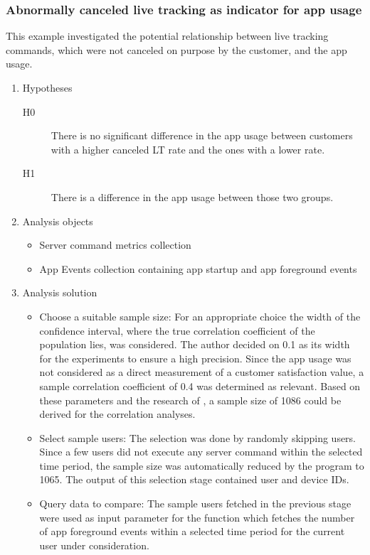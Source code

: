 \subsubsection{Abnormally canceled live tracking as indicator for app usage}
\label{sssec:liveTrackingAppUsage}
This example investigated the potential relationship between live tracking commands, which were not canceled on purpose by the customer, and the app usage.  

\begin{enumerate}
	\item Hypotheses
	\begin{description}
		\item[H0] There is no significant difference in the app usage between customers with a higher canceled LT rate and the ones with a lower rate.
		\item [H1] There is a difference in the app usage between those two groups. 
	\end{description}
	\item Analysis objects
	\begin{itemize}
		\item Server command metrics collection
		\item App Events collection containing app startup and app foreground events
	\end{itemize}
	\item Analysis solution
	\begin{itemize}
		\item Choose a suitable sample size: For an appropriate choice the width of the confidence interval, where the true correlation coefficient of the population lies, was considered. The author decided on 0.1 as its width for the experiments to ensure a high precision. Since the app usage was not considered as a direct measurement of a customer satisfaction value, a sample correlation coefficient of 0.4 was determined as relevant. Based on these parameters and the research of \cite{moinester2014sample}, a sample size of 1086 could be derived for the correlation analyses. 
		\item Select sample users: The selection was done by randomly skipping users. Since a few users did not execute any server command within the selected time period, the sample size was automatically reduced by the program to 1065. The output of this selection stage contained user and device IDs.
		\item Query data to compare: The sample users fetched in the previous stage were used as input parameter for the function which fetches the number of app foreground events within a selected time period for the current user under consideration. 

\end{itemize}
\end{enumerate}
